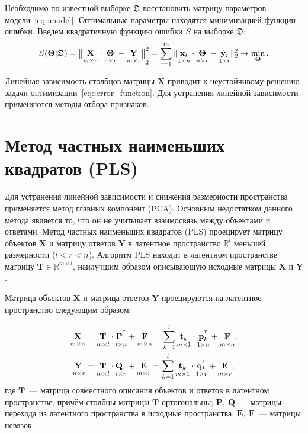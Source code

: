 \documentclass[12pt,twoside]{article}
\newcommand{\bx}{\mathbf{x}}
\newcommand{\by}{\mathbf{y}}
\newcommand{\bY}{\mathbf{Y}}
\newcommand{\bX}{\mathbf{X}}
\newcommand{\bt}{\mathbf{t}}
\newcommand{\bp}{\mathbf{p}}
\newcommand{\bq}{\mathbf{q}}
\newcommand{\bP}{\mathbf{P}}
\newcommand{\bT}{\mathbf{T}}
\newcommand{\bQ}{\mathbf{Q}}
\newcommand{\bE}{\mathbf{E}}
\newcommand{\bF}{\mathbf{F}}
\newcommand{\bTheta}{\boldsymbol{\Theta}}
\newcommand{\T}{^{\text{\tiny\sffamily\upshape\mdseries T}}}
\begin{document}
Необходимо по известной выборке $\mathfrak{D}$ восстановить матрицу параметров модели~\eqref{eq::model}.
Оптимальные параметры находятся минимизацией функции ошибки.
Введем квадратичную функцию ошибки $S$ на выборке $\mathfrak{D}$:
\begin{equation}
	S(\bTheta | \mathfrak{D}) = {\bigl\| \underset{m \times n}{\vphantom{\by}\mathbf{X}} \cdot \underset{n \times r}{\vphantom{\by}\bTheta} - \underset{m \times r}{\vphantom{\by}\mathbf{Y}} \bigr\| }_2^2 = \sum_{i=1}^m \| \underset{1 \times n}{\vphantom{\by}\bx_i} \cdot \underset{n \times r}{\vphantom{\by}\bTheta} - \underset{1 \times r}{\vphantom{\by}\by_i} \|_2^2 \rightarrow\min_{\bTheta}.
\label{eq::error_function}
\end{equation}
 
Линейная зависимость столбцов матрицы $\bX$ приводит к неустойчивому решению задачи оптимизации~\eqref{eq::error_function}. Для устранения линейной зависимости применяются методы отбора признаков.

\section{Метод частных наименьших квадратов (PLS)}

Для устранения линейной зависимости и снижения размерности пространства применяется метод главных компонент (PCA). 
Основным недостатком данного метода является то, что он не учитывает взаимосвязь между объектами и ответами.
Метод частных наименьших квадратов (PLS) проецирует матрицу объектов $\bX$ и матрицу ответов $\bY$ в латентное пространство $\mathbb{R}^l$ меньшей размерности ($l < r < n$).
Алгоритм PLS находит в латентном пространстве матрицу $\bT \in \mathbb{R}^{m \times l}$, наилучшим образом описывающую исходные матрицы $\bX$ и $\bY$.

Матрица объектов $\bX$ и матрица ответов $\bY$ проецируются на латентное пространство следующим образом:

\begin{align}
\label{eq::PLS_X}
 \underset{m \times n}{\vphantom{\bQ}\bX} 
 &= \underset{m \times l}{\vphantom{\bQ}\bT} \cdot \underset{l \times n}{\vphantom{\bQ}\bP^{\T}} + \underset{m \times n}{\vphantom{\bQ}\bF} 
 = \sum_{k=1}^l \underset{m \times 1}{\vphantom{\bp_k^{\T}}\bt_k} \cdot \underset{1 \times n}{\bp_k^{\T}} + \underset{m \times n}{\vphantom{\bp_k^{\T}}\bF},\\
 \label{eq::PLS_Y}
 \underset{m \times r}{\vphantom{\bQ}\bY} 
 &= \underset{m \times l}{\vphantom{\bQ}\bT} \cdot \underset{l \times r}{\bQ^{\T}} + \underset{m \times r}{\vphantom{\bQ}\bE}
 =  \sum_{k=1}^l  \underset{m \times 1}{\vphantom{\bq_k^{\T}}\bt_k} \cdot \underset{1 \times r}{\bq_k^{\T}} +  \underset{m \times r}{\vphantom{\bq_k^{\T}}\bE},
\end{align}
где $\bT$~--- матрица совместного описания объектов и ответов в латентном пространстве, причём столбцы матрицы $\bT$ ортогональны; $\bP,\ \bQ$~--- матрицы перехода из латентного пространства в  исходные пространства; $\bE,\ \bF$~--- матрицы невязок. 
\end{document}
